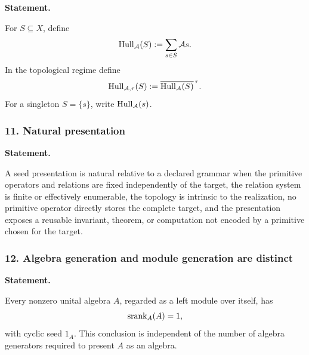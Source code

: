 \label{rec:PSC-I-D-GENERATED-HULL}
\textbf{Statement.}\par
For $S\subseteq X$, define
\[
\operatorname{Hull}_{\mathcal A}(S):=\sum_{s\in S}\mathcal A s.
\]
In the topological regime define
\[
\operatorname{Hull}_{\mathcal A,\tau}(S):=\overline{\operatorname{Hull}_{\mathcal A}(S)}^{\,\tau}.
\]
For a singleton $S=\{s\}$, write $\operatorname{Hull}_{\mathcal A}(s)$.
\subsubsection*{11. Natural presentation}
\label{rec:PSC-I-D-NATURAL-PRESENTATION}
\textbf{Statement.}\par
A seed presentation is natural relative to a declared grammar when the primitive operators and relations are fixed independently of the target, the relation system is finite or effectively enumerable, the topology is intrinsic to the realization, no primitive operator directly stores the complete target, and the presentation exposes a reusable invariant, theorem, or computation not encoded by a primitive chosen for the target.
\subsubsection*{12. Algebra generation and module generation are distinct}
\label{rec:PSC-I-P-ALGEBRA-MODULE-GENERATION}
\textbf{Statement.}\par
Every nonzero unital algebra $A$, regarded as a left module over itself, has
\[
\operatorname{srank}_A(A)=1,
\]
with cyclic seed $1_A$.  This conclusion is independent of the number of algebra generators required to present $A$ as an algebra.

